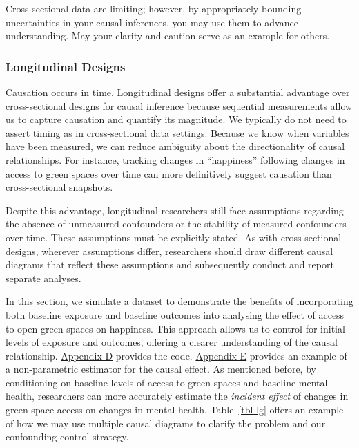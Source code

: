 \documentclass[
  singlecolumn]{article}
\begin{document}
Cross-sectional data are limiting; however, by appropriately bounding
uncertainties in your causal inferences, you may use them to advance
understanding. May your clarity and caution serve as an example for
others.

\subsubsection{Longitudinal Designs}\label{longitudinal-designs}

Causation occurs in time. Longitudinal designs offer a substantial
advantage over cross-sectional designs for causal inference because
sequential measurements allow us to capture causation and quantify its
magnitude. We typically do not need to assert timing as in
cross-sectional data settings. Because we know when variables have been
measured, we can reduce ambiguity about the directionality of causal
relationships. For instance, tracking changes in ``happiness'' following
changes in access to green spaces over time can more definitively
suggest causation than cross-sectional snapshots.

Despite this advantage, longitudinal researchers still face assumptions
regarding the absence of unmeasured confounders or the stability of
measured confounders over time. These assumptions must be explicitly
stated. As with cross-sectional designs, wherever assumptions differ,
researchers should draw different causal diagrams that reflect these
assumptions and subsequently conduct and report separate analyses.

In this section, we simulate a dataset to demonstrate the benefits of
incorporating both baseline exposure and baseline outcomes into
analysing the effect of access to open green spaces on happiness. This
approach allows us to control for initial levels of exposure and
outcomes, offering a clearer understanding of the causal relationship.
\hyperref[appendix-d-simulation-of-different-confounding-control-strategies]{Appendix
D} provides the code.
\hyperref[appendix-e-non-parametric-estimation-of-average-treatment-effects-using-causal-forests]{Appendix
E} provides an example of a non-parametric estimator for the causal
effect. As mentioned before, by conditioning on baseline levels of
access to green spaces and baseline mental health, researchers can more
accurately estimate the \emph{incident effect} of changes in green space
access on changes in mental health. Table~\ref{tbl-lg} offers an example
of how we may use multiple causal diagrams to clarify the problem and
our confounding control strategy.
\end{document}

